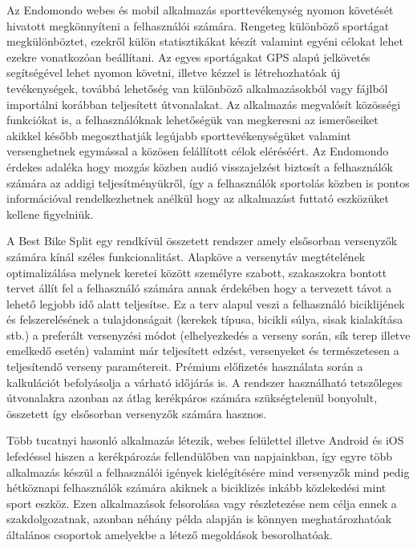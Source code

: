 Az Endomondo \cite{endomondo} webes és mobil alkalmazás sporttevékenység nyomon követését hivatott megkönnyíteni a felhasználói számára. Rengeteg különböző sportágat megkülönböztet, ezekről külön statisztikákat készít valamint egyéni célokat lehet ezekre vonatkozóan beállítani. Az egyes sportágakat GPS alapú jelkövetés segítségével lehet nyomon követni, illetve kézzel is létrehozhatóak új tevékenységek, továbbá lehetőség van különböző alkalmazásokból vagy fájlból importálni korábban teljesített útvonalakat. Az alkalmazás megvalósít közösségi funkciókat is, a felhasználóknak lehetőségük van megkeresni az ismerőseiket akikkel később megoszthatják legújabb sporttevékenységüket valamint versenghetnek egymással a közösen felállított célok eléréséért. Az Endomondo érdekes adaléka hogy mozgás közben audió visszajelzést biztosít a felhasználók számára az addigi teljesítményükről, így a felhasználók sportolás közben is pontos információval rendelkezhetnek anélkül hogy az alkalmazást futtató eszközüket kellene figyelniük.


A Best Bike Split \cite{bestbikesplit} egy rendkívül összetett rendszer amely elsősorban versenyzők számára kínál széles funkcionalitást. Alapköve a versenytáv megtételének optimalizálása melynek keretei között személyre szabott, szakaszokra bontott tervet állít fel a felhasználó számára annak érdekében hogy a tervezett távot a lehető legjobb idő alatt teljesítse. Ez a terv alapul veszi a felhasználó biciklijének és felszerelésének a tulajdonságait (kerekek típusa, bicikli súlya, sisak kialakítása stb.) a preferált versenyzési módot (elhelyezkedés a verseny során, sík terep illetve emelkedő esetén) valamint már teljesített edzést, versenyeket és természetesen a teljesítendő verseny paramétereit. Prémium előfizetés használata során a kalkulációt befolyásolja a várható időjárás is. A rendszer használható tetszőleges útvonalakra azonban az átlag kerékpáros számára szükségtelenül bonyolult, összetett így elsősorban versenyzők számára hasznos.

Több tucatnyi hasonló alkalmazás létezik, webes felülettel illetve Android és iOS lefedéssel hiszen a kerékpározás fellendülőben van napjainkban, így egyre több alkalmazás készül a felhasználói igények kielégítésére mind versenyzők mind pedig hétköznapi felhasználók számára akiknek a biciklizés inkább közlekedési mint sport eszköz. Ezen alkalmazások felsorolása vagy részletezése nem célja ennek a szakdolgozatnak, azonban néhány példa alapján is könnyen meghatározhatóak általános csoportok amelyekbe a létező megoldások besorolhatóak.


